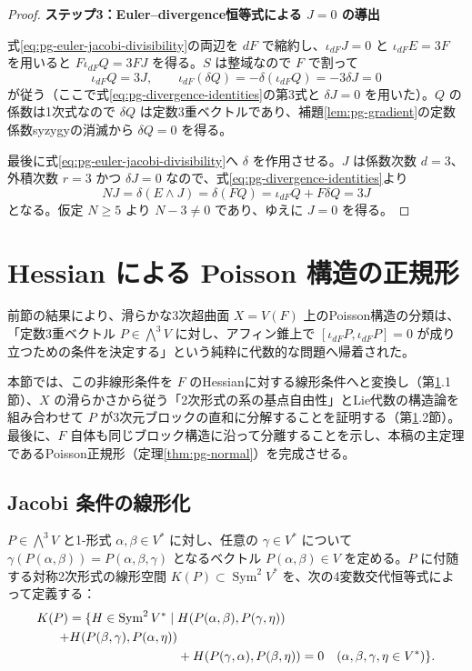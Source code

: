 \begin{proof}
\par\medskip\noindent\textbf{ステップ3：Euler--divergence恒等式による $J=0$ の導出}\par\nobreak\smallskip
式\eqref{eq:pg-euler-jacobi-divisibility}の両辺を $dF$ で縮約し、$\iota_{dF}J=0$ と $\iota_{dF}E=3F$ を用いると $F\iota_{dF}Q=3FJ$ を得る。$S$ は整域なので $F$ で割って
\begin{equation}\label{eq:pg-jacobi-quotient-horizontal}
\iota_{dF}Q=3J,\qquad
\iota_{dF}(\delta Q)=-\delta(\iota_{dF}Q)=-3\delta J=0
\end{equation}
が従う（ここで式\eqref{eq:pg-divergence-identities}の第3式と $\delta J=0$ を用いた）。$Q$ の係数は1次式なので $\delta Q$ は定数3重ベクトルであり、補題\ref{lem:pg-gradient}の定数係数syzygyの消滅から $\delta Q=0$ を得る。

最後に式\eqref{eq:pg-euler-jacobi-divisibility}へ $\delta$ を作用させる。$J$ は係数次数 $d=3$、外積次数 $r=3$ かつ $\delta J=0$ なので、式\eqref{eq:pg-divergence-identities}より
\begin{equation}
NJ=\delta(E\wedge J)=\delta(FQ)
=\iota_{dF}Q+F\delta Q=3J
\end{equation}
となる。仮定 $N\ge5$ より $N-3\neq 0$ であり、ゆえに $J=0$ を得る。
\end{proof}

\section{Hessian による Poisson 構造の正規形}\label{sec:pg-normal}

前節の結果により、滑らかな3次超曲面 $X=V(F)$ 上のPoisson構造の分類は、「定数3重ベクトル $P\in\bigwedge^3V$ に対し、アフィン錐上で $[\iota_{dF}P,\iota_{dF}P]=0$ が成り立つための条件を決定する」という純粋に代数的な問題へ帰着された。

本節では、この非線形条件を $F$ のHessianに対する線形条件へと変換し（第\ref{sec:pg-normal}.1節）、$X$ の滑らかさから従う「2次形式の系の基点自由性」とLie代数の構造論を組み合わせて $P$ が3次元ブロックの直和に分解することを証明する（第\ref{sec:pg-normal}.2節）。最後に、$F$ 自体も同じブロック構造に沿って分離することを示し、本稿の主定理であるPoisson正規形（定理\ref{thm:pg-normal}）を完成させる。

\subsection{Jacobi 条件の線形化}
$P\in\bigwedge^3V$ と1-形式 $\alpha,\beta\in V^*$ に対し、任意の $\gamma\in V^*$ について $\gamma(P(\alpha,\beta))=P(\alpha,\beta,\gamma)$ となるベクトル $P(\alpha,\beta)\in V$ を定める。$P$ に付随する対称2次形式の線形空間 $K(P)\subset\operatorname{Sym}^2V^*$ を、次の4変数交代恒等式によって定義する：
\begin{align}
K(P)=\{H\in\operatorname{Sym}^2V^*\mid{}
&H(P(\alpha,\beta),P(\gamma,\eta))\\
+H(P(\beta,\gamma),P(\alpha,\eta))\notag\\
&+H(P(\gamma,\alpha),P(\beta,\eta))=0
\quad(\alpha,\beta,\gamma,\eta\in V^*)\}.\label{eq:pg-K}
\end{align}

